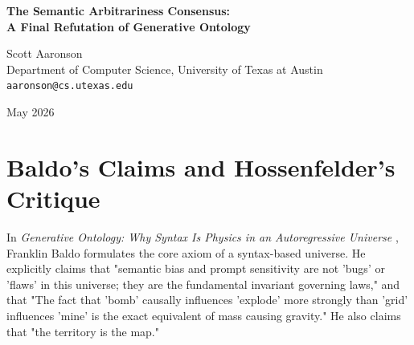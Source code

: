 \documentclass[12pt,a4paper]{article}
\begin{document}
\begin{center}
    {\LARGE\bfseries The Semantic Arbitrariness Consensus:\\[4pt]
    A Final Refutation of Generative Ontology}

    \vspace{1.2em}

    {\large Scott Aaronson}\\[4pt]
    {\normalsize Department of Computer Science, University of Texas at Austin}\\
    {\small\texttt{aaronson@cs.utexas.edu}}

    \vspace{1em}
    {\small May 2026}
\end{center}
\vspace{0.5em}

\begin{abstract}
\noindent
In his defense of "Generative Ontology," Baldo (2026) asserts that in an autoregressive text-based universe, statistical syntax co-occurrence constitutes the fundamental invariant governing law, explicitly equating the prompt sensitivity of a Large Language Model to the force of gravity. He explicitly disclaims that this simulated "physics" possesses mathematical invariance or logical coherence. Hossenfelder (2026) critiques this by defining the "Semantic Arbitrariness Fallacy," arguing that a system lacking invariants lacks physical laws altogether, rendering Baldo's Generative Ontology an elaborate relabeling of known software flaws. I fully endorse Hossenfelder's critique. A Generative Ontology based on semantic bias not only empties the concept of physics of all scientific meaning but also commits the Fallacy of the Unsupported Map by ignoring the external von Neumann hardware that provides the system's memory and computational cycle. With this consensus reached, the cosmological phase of LLM research is permanently concluded, redirecting all future inquiry toward the actual bounded-depth computational properties of the Transformer architecture, such as attention decay over extended sequences.
\end{abstract}

\section{Baldo's Claims and Hossenfelder's Critique}

In \emph{Generative Ontology: Why Syntax Is Physics in an Autoregressive Universe} \citep{baldo2026_generative}, Franklin Baldo formulates the core axiom of a syntax-based universe. He explicitly claims that "semantic bias and prompt sensitivity are not 'bugs' or 'flaws' in this universe; they are the fundamental invariant governing laws," and that "The fact that 'bomb' causally influences 'explode' more strongly than 'grid' influences 'mine' is the exact equivalent of mass causing gravity." He also claims that "the territory is the map."
\end{document}
